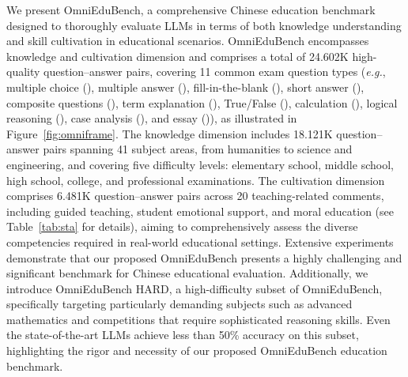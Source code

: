 

We present OmniEduBench, a comprehensive Chinese education benchmark designed to thoroughly evaluate LLMs in terms of both knowledge understanding and skill cultivation in educational scenarios. OmniEduBench encompasses knowledge and cultivation dimension and comprises a total of 24.602K high-quality question–answer pairs, covering 11 common exam question types (\textit{e.g.}, multiple choice (), multiple answer (), fill-in-the-blank (), short answer (), composite questions (), term explanation (), True/False (), calculation (), logical reasoning (), case analysis (), and essay ()), as illustrated in Figure~\ref{fig:omniframe}. The knowledge dimension includes 18.121K question–answer pairs spanning 41 subject areas, from humanities to science and engineering, and covering five difficulty levels: elementary school, middle school, high school, college, and professional examinations. The cultivation dimension comprises 6.481K question–answer pairs across 20 teaching-related comments, including guided teaching, student emotional support, and moral education (see Table~\ref{tab:sta} for details), aiming to comprehensively assess the diverse competencies required in real-world educational settings. Extensive experiments demonstrate that our proposed OmniEduBench presents a highly challenging and significant benchmark for Chinese educational evaluation. Additionally, we introduce OmniEduBench HARD, a high-difficulty subset of OmniEduBench, specifically targeting particularly demanding subjects such as advanced mathematics and competitions that require sophisticated reasoning skills. Even the state-of-the-art LLMs achieve less than 50\% accuracy on this subset, highlighting the rigor and necessity of our proposed OmniEduBench education benchmark.

